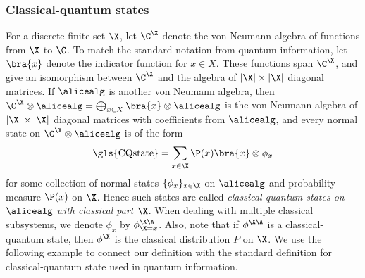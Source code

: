 \subsubsection{Classical-quantum states}

For a discrete finite set $\X$, let $\C^{\X}$ denote the von Neumann algebra of functions from $\X$ to $\C$. To match the standard notation from quantum information, let $\bra{x}$ denote the indicator function for $x \in X$. These functions span $\C^{\X}$, and give an isomorphism between $\C^{\X}$ and the algebra of $|\X| \times |\X|$ diagonal matrices. If $\alicealg$ is another von Neumann algebra, then $\C^{\X} \otimes \alicealg = \bigoplus_{x \in X} \bra{x} \otimes \alicealg$ is the von Neumann algebra of $|\X| \times |\X|$ diagonal matrices with coefficients from $\alicealg$, and every normal state on $\C^{\X} \otimes \alicealg$ is of the form 
\begin{equation*}
	\text{\gls{CQstate}}= \sum_{x \in \X} \P(x)\bra{x} \otimes \phi_x 
\end{equation*}
for some collection of normal states $\{ \phi_x \}_{x \in \X}$ on $\alicealg$ and probability measure $\P(x)$ on $\X$. Hence such states are called \emph{classical-quantum states on $\alicealg$ with classical part $\X$}. When dealing with multiple classical subsystems, we denote $\phi_x$ by $\phi^{\X\A}_{\X=x}$. Also, note that if $\phi^{\X\A}$ is a classical-quantum state, then $\phi^{\X}$ is the classical distribution $P$ on $\X$. We use the following example to connect our definition with the standard definition for classical-quantum state used in quantum information. 
